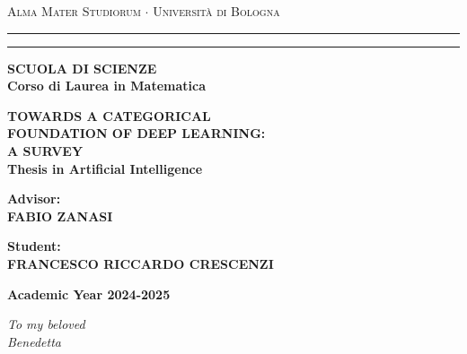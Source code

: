 \documentclass[11pt,a4paper,openright,twoside]{report}
\theoremstyle{plain}
\theoremstyle{definition}
\begin{document}



\begin{titlepage}
  \begin{center}
    {
      {\Large
        {\textsc{
          Alma Mater Studiorum $\cdot$ Università di Bologna
        }}
      }
    }
    \rule[0.1cm]{15.8cm}{0.1mm}
    \rule[0.5cm]{15.8cm}{0.6mm}
    {\small
      {\bf 
        SCUOLA DI SCIENZE\\
        Corso di Laurea in Matematica
      }
    }
    \end{center}
    \vspace{15mm}
    \begin{center}
      {\LARGE{\bf TOWARDS A CATEGORICAL }}\\
      \vspace{3mm}
      {\LARGE{\bf FOUNDATION OF DEEP LEARNING:}}\\
      \vspace{3mm}
      {\LARGE{\bf A SURVEY}}\\
      \vspace{19mm}
      {\large
        {\bf
          Thesis in Artificial Intelligence
        }
      }
    \end{center}
    \vspace{40mm}
    \par
    \noindent
    \begin{minipage}[t]{0.47\textwidth}
      {\large
        {\bf
          Advisor:\\
          FABIO ZANASI
        }
      }
    \end{minipage}
    \hfill
    \begin{minipage}[t]{0.47\textwidth}\raggedleft
      {\large
        {\bf 
          Student:\\
          FRANCESCO RICCARDO CRESCENZI
        }
      }
    \end{minipage}
    \vspace{30mm}
    \begin{center}
    {\large
      {\bf 
        Academic Year 2024-2025
      }
    }
  \end{center}
\end{titlepage}


\begin{titlepage}
\thispagestyle{empty}                   
\topmargin=6.5cm                        
\raggedleft                             
\large 
                             
\em                                     
To my beloved\\
Benedetta                   
\newpage                                

\clearpage{\pagestyle{empty}\cleardoublepage}
\end{titlepage}
\end{document}
